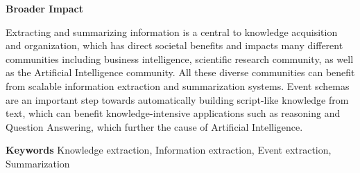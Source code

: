 {\bf Broader Impact} 

Extracting and summarizing information is a central to knowledge acquisition and organization, which has direct societal benefits and impacts many different communities including business intelligence, scientific research community, as well as the Artificial Intelligence community. All these diverse communities can benefit from scalable information extraction and summarization systems. Event schemas are an important step towards automatically building script-like knowledge from text, which can benefit knowledge-intensive applications such as reasoning and Question Answering, which further the cause of Artificial Intelligence. 

{\bf Keywords} Knowledge extraction, Information extraction, Event extraction, Summarization

%
